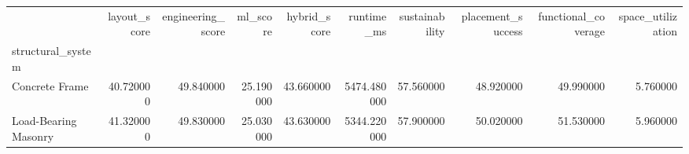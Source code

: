 \begin{tabular}{lrrrrrrrrr}
 & layout_score & engineering_score & ml_score & hybrid_score & runtime_ms & sustainability & placement_success & functional_coverage & space_utilization \\
structural_system &  &  &  &  &  &  &  &  &  \\
Concrete Frame & 40.720000 & 49.840000 & 25.190000 & 43.660000 & 5474.480000 & 57.560000 & 48.920000 & 49.990000 & 5.760000 \\
Load-Bearing Masonry & 41.320000 & 49.830000 & 25.030000 & 43.630000 & 5344.220000 & 57.900000 & 50.020000 & 51.530000 & 5.960000 \\
\end{tabular}
